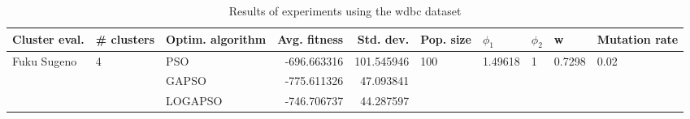 \begin{table}
\centering
\caption{Results of experiments using the wdbc dataset}
\begin{tabular}{lllrrlllll}
\toprule
               Cluster eval. &        \# clusters & Optim. algorithm &  Avg. fitness &  Std. dev. &            Pop. size &               $\phi_{1}$ &         $\phi_{2}$ &                       w &         Mutation rate \\
\midrule
\multirow{3}{*}{Fuku Sugeno} & \multirow{3}{*}{4} &              PSO &   -696.663316 & 101.545946 & \multirow{3}{*}{100} & \multirow{3}{*}{1.49618} & \multirow{3}{*}{1} & \multirow{3}{*}{0.7298} & \multirow{3}{*}{0.02} \\
                             &                    &            GAPSO &   -775.611326 &  47.093841 &                      &                          &                    &                         &                       \\
                             &                    &          LOGAPSO &   -746.706737 &  44.287597 &                      &                          &                    &                         &                       \\
\bottomrule
\end{tabular}
\end{table}
